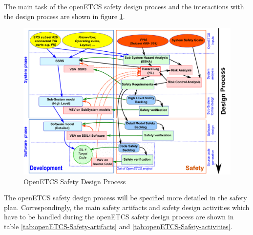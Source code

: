 \documentclass{template/openetcs_report}
\begin{document}
The main task of the openETCS safety design process and the interactions with the design process are shown in figure \ref{fig:WholeSafetyProcess}.

\begin{figure}[htbp]
\centering
\includegraphics[width=0.8\linewidth]{WholeSafetyProcess}
\caption{OpenETCS Safety Design Process}
\label{fig:WholeSafetyProcess}
\end{figure}

The openETCS safety design process will be specified more detailed in the safety plan. Correspondingly, the main safety artifacts and safety design activities which have to be handled during the openETCS safety design process are shown in table \ref{tab:openETCS-Safety-artifacts} and \ref{tab:openETCS-Safety-activities}.
\end{document}
